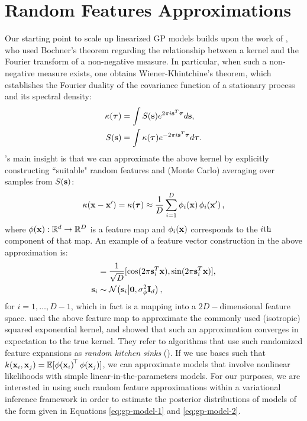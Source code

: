 \section{Random Features Approximations}
%
Our starting point to scale up linearized GP models builds upon the work of 
\citeauthor{rahimi-recht-nips-2007} \citeyearpar{rahimi-recht-nips-2007,rahimi-recht-nips-2008},  
who used Bochner's theorem regarding the relationship between 
a kernel %
and the Fourier transform of a non-negative measure. In particular, 
when such a non-negative measure exists, one obtains  Wiener-Khintchine's theorem, which establishes  
 the Fourier duality of the covariance function of a stationary  process and its spectral density:
\begin{align}
	\label{eq:fourier}
	\kappa(\boldsymbol{ \tau }) &= \int S(\mathbf{s}) e^{2 \pi i \mathbf{s}^T  \boldsymbol{ \tau } } d \mathbf{s} \text{,}  \\
	S(\mathbf{s}) &= \int \kappa(\boldsymbol{ \tau }) e^{- 2 \pi i \mathbf{s}^T \boldsymbol{ \tau } }  d \boldsymbol{ \tau } \text{.}
\end{align}
\citeauthor{rahimi-recht-nips-2007}'s  main insight  \citeyearpar{rahimi-recht-nips-2007} 
is that we can approximate the above kernel by explicitly constructing 
``suitable" random features and (Monte Carlo) averaging over samples from $S(\mathbf{s})$: 
\begin{equation}
	\label{eq:mcapprox}
	 \kappa(\mathbf{x}-\mathbf{x}^\prime) = \kappa(\boldsymbol{ \tau }) 
	\approx \frac{1}{D} \sum_{i=1}^{D} \phi_{i}\!\left({{\mathbf{x}}}\right) \phi_{i}\!\left({{\mathbf{x}^\prime}}\right)  \text{,}
\end{equation}
where $\phi\!\left({{\mathbf{x}}}\right): \mathbb{R}^{d} \to \mathbb{R}^{D}$ is a feature map and 
$\phi_{i}\!\left({{\mathbf{x}}}\right)$ corresponds to the $i\mathrm{th}$ component of that map.
%
An example of a feature vector construction in the above approximation is:
\begin{align}
	[\singlefeatfunc{\x}{i} ,\singlefeatfunc{\x}{i+1} ] &= \frac{1}{\sqrt{D}} [ \cos(2 \pi \ffourier_i^T \x) , \sin(2 \pi \ffourier_i^T \ins) ] \text{,}\\
		\ffourier_i & \sim \gausC{\ffourier_i}{\vec{0}, \varfeat \ident{d}} \text{,}
\end{align}
for $i=1, \ldots, D-1$,  which in fact is a mapping into a $2 D-$dimensional feature space. 
\citet{rahimi-recht-nips-2007} used the above feature map to approximate the commonly used 
(isotropic) squared exponential kernel, and showed that such an approximation
converges in expectation 
to the true kernel. They refer to algorithms that use such randomized feature expansions 
as \emph{random kitchen sinks} (\rks).  
%
If we use \rks bases  such that
$k\!\left({{\mathbf{x}_i}, {\mathbf{x}_j}}\right) = 
\mathbb{E}[\phi\!\left({{\mathbf{x}_i}}\right)^{\!\top}\phi\!\left({{\mathbf{x}_j}}\right)]$, we can
approximate \gp models that involve nonlinear likelihoods 
with simple linear-in-the-parameters models. 
For our purposes, we are 
interested in using such random feature approximations within a variational inference 
framework in order to estimate the posterior distributions of models of the form given
in Equations \eqref{eq:gp-model-1} and \eqref{eq:gp-model-2}.
%

